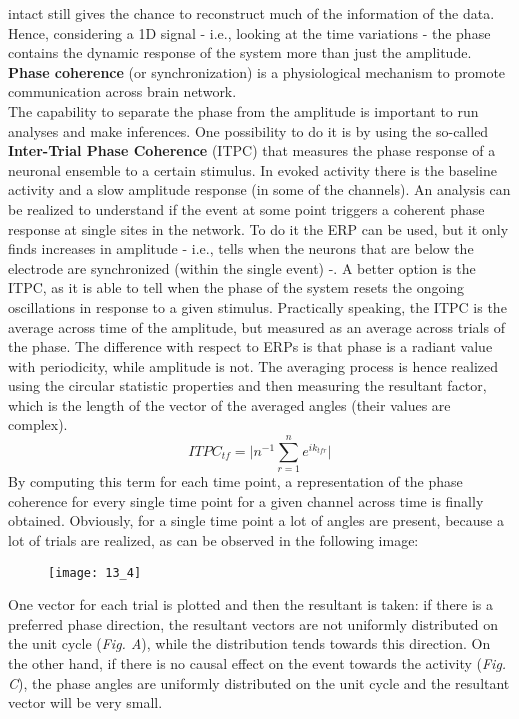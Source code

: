 intact still gives the chance to reconstruct much of the information of the data.\\
Hence, considering a 1D signal - i.e., looking at the time variations - the phase
contains the dynamic response of the system more than just the amplitude.
\textbf{Phase coherence} (or synchronization) is a physiological mechanism to promote
communication across brain network.\\
The capability to separate the phase from the amplitude is important to run analyses
and make inferences.
One possibility to do it is by using the so-called \textbf{Inter-Trial Phase Coherence}
(ITPC) that measures the phase response of a neuronal ensemble to a certain stimulus.
In evoked activity there is the baseline activity and a slow amplitude response (in
some of the channels). An analysis can be realized to understand if the event at some
point triggers a coherent phase response at single sites in the network.
To do it the ERP can be used, but it only finds increases in amplitude - i.e., tells
when the neurons that are below the electrode are synchronized (within the single
event) -. A better option is the ITPC, as it is able to tell when the phase of the
system resets the ongoing oscillations in response to a given stimulus.
Practically speaking, the ITPC is the average across time of the amplitude, but
measured as an average across trials of the phase. The difference with respect to ERPs
is that phase is a radiant value with periodicity, while amplitude is not.
The averaging process is hence realized using the circular statistic properties and
then measuring the resultant factor, which is the length of the vector of the
averaged angles (their values are complex).
\begin{equation*}
    ITPC_{tf}=\biggl|n^{-1}\sum_{r=1}^ne^{ik_{tfr}}\biggr|
\end{equation*}
By computing this term for each time point, a representation of the phase coherence
for every single time point for a given channel across time is finally obtained.
Obviously, for a single time point a lot of angles are present, because a lot of
trials are realized, as can be observed in the following image:
\begin{figure}[H]
    \centering
    \texttt{[image: 13\_4]}
\end{figure}
One vector for each trial is plotted and then the resultant is taken: if there is a
preferred phase direction, the resultant vectors are not uniformly distributed on the
unit cycle (\textit{Fig. A}), while the distribution tends towards this direction.
On the other hand, if there is no causal effect on the event towards the activity
(\textit{Fig. C}), the phase angles are uniformly distributed on the unit cycle and
the resultant vector will be very small.

